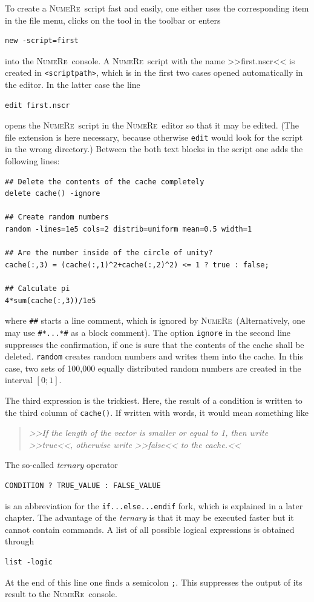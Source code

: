 \documentclass[DIV=14,headsepline,footsepline]{scrbook}
\newcommand{\NR}{\textsc{Nu\-me\-Re}}
\begin{document}
				To create a \NR\ script fast and easily, one either uses the corresponding item in the file menu, clicks on the tool in the toolbar or enters 
				\begin{lstlisting}
new -script=first
				\end{lstlisting}
				into the \NR\ console. A \NR\ script with the name >>first.nscr<< is created in \lstinline+<scriptpath>+, which is in the first two cases opened automatically in the editor. In the latter case the line
				\begin{lstlisting}
edit first.nscr
				\end{lstlisting}
				opens the \NR\ script in the \NR\ editor so that it may be edited. (The file extension is here necessary, because otherwise \lstinline+edit+ would look for the script in the wrong directory.) Between the both text blocks in the script one adds the following lines:
				\begin{lstlisting}
## Delete the contents of the cache completely
delete cache() -ignore

## Create random numbers
random -lines=1e5 cols=2 distrib=uniform mean=0.5 width=1

## Are the number inside of the circle of unity?
cache(:,3) = (cache(:,1)^2+cache(:,2)^2) <= 1 ? true : false;

## Calculate pi
4*sum(cache(:,3))/1e5
				\end{lstlisting}
				where \lstinline+##+ starts a line comment, which is ignored by \NR\ (Alternatively, one may use \lstinline+#*...*#+ as a block comment). The option \lstinline+ignore+ in the second line suppresses the confirmation, if one is sure that the contents of the cache shall be deleted. \lstinline+random+ creates random numbers and writes them into the cache. In this case, two sets of 100,000 equally distributed random numbers are created in the interval $[0;1]$.
				
				The third expression is the trickiest. Here, the result of a condition is written to the third column of \lstinline+cache()+. If written with words, it would mean something like
				\begin{quotation}
					\noindent\emph{>>If the length of the vector is smaller or equal to 1, then write >>true<<, otherwise write >>false<< to the cache.<<}
				\end{quotation}
				The so-called \emph{ternary} operator
				\begin{lstlisting}
CONDITION ? TRUE_VALUE : FALSE_VALUE
				\end{lstlisting}
				is an abbreviation for the \lstinline+if...else...endif+ fork, which is explained in a later chapter. The advantage of the \emph{ternary} is that it may be executed faster but it cannot contain commands. A list of all possible logical expressions is obtained through
				\begin{lstlisting}
list -logic
				\end{lstlisting}
				At the end of this line one finds a semicolon \lstinline+;+. This suppresses the output of its result to the \NR\ console.
				
\end{document}
